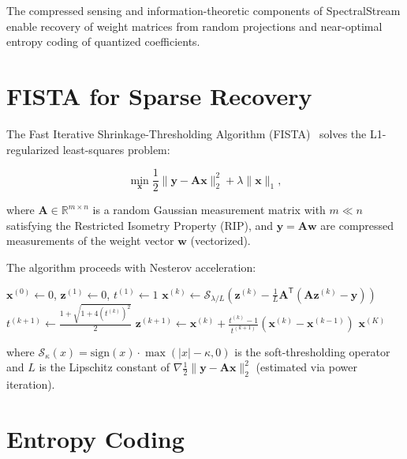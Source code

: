 \documentclass[11pt,a4paper,openright]{book}
\begin{document}
The compressed sensing and information-theoretic components of SpectralStream enable recovery of weight matrices from random projections and near-optimal entropy coding of quantized coefficients.

\section{FISTA for Sparse Recovery}

The Fast Iterative Shrinkage-Thresholding Algorithm (FISTA)~\cite{beck2009fista} solves the L1-regularized least-squares problem:

\begin{equation}
	\label{eq:fista}
	\min_{\mathbf{x}} \frac{1}{2}\|\mathbf{y} - \mathbf{A}\mathbf{x}\|_2^2 + \lambda\|\mathbf{x}\|_1,
\end{equation}

where $\mathbf{A} \in \mathbb{R}^{m \times n}$ is a random Gaussian measurement matrix with $m \ll n$ satisfying the Restricted Isometry Property (RIP), and $\mathbf{y} = \mathbf{A}\mathbf{w}$ are compressed measurements of the weight vector $\mathbf{w}$ (vectorized).

The algorithm proceeds with Nesterov acceleration:

\begin{algorithm}[H]
	\caption{FISTA for sparse weight recovery}
	\begin{algorithmic}[1]
		\State $\mathbf{x}^{(0)} \gets 0$, $\mathbf{z}^{(1)} \gets 0$, $t^{(1)} \gets 1$
		\State $\mathbf{x}^{(k)} \gets \mathcal{S}_{\lambda/L}(\mathbf{z}^{(k)} - \frac{1}{L}\mathbf{A}^\mathsf{T}(\mathbf{A}\mathbf{z}^{(k)} - \mathbf{y}))$
		\State $t^{(k+1)} \gets \frac{1 + \sqrt{1 + 4(t^{(k)})^2}}{2}$
		\State $\mathbf{z}^{(k+1)} \gets \mathbf{x}^{(k)} + \frac{t^{(k)}-1}{t^{(k+1)}}(\mathbf{x}^{(k)} - \mathbf{x}^{(k-1)})$
		\EndFor
		\State \Return $\mathbf{x}^{(K)}$
	\end{algorithmic}
\end{algorithm}

where $\mathcal{S}_\kappa(x) = \text{sign}(x) \cdot \max(|x| - \kappa, 0)$ is the soft-thresholding operator and $L$ is the Lipschitz constant of $\nabla \frac{1}{2}\|\mathbf{y} - \mathbf{A}\mathbf{x}\|_2^2$ (estimated via power iteration).

\section{Entropy Coding}
\end{document}
